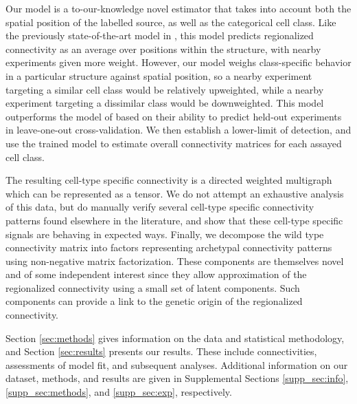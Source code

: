 Our model is a to-our-knowledge novel estimator that takes into account both the spatial position of the labelled source, as well as the categorical cell class.
Like the previously state-of-the-art model in \citet{Knox2019-ot}, this model predicts regionalized connectivity as an average over positions within the structure, with nearby experiments given more weight.
However, our model weighs class-specific behavior in a particular structure against spatial position, so a nearby experiment targeting a similar cell class would be relatively upweighted, while a nearby experiment targeting a dissimilar class would be downweighted.
This model outperforms the model of  \citet{Knox2019-ot} based on their ability to predict held-out experiments in leave-one-out cross-validation.
We then establish a lower-limit of detection, and use the trained model to estimate overall connectivity matrices for each assayed cell class.

The resulting cell-type specific connectivity is a directed weighted multigraph which can be represented as a  tensor.
We do not attempt an exhaustive analysis of this data, but do manually verify several cell-type specific connectivity patterns found elsewhere in the literature, and show that these cell-type specific signals are behaving in expected ways.
Finally, we decompose the wild type connectivity matrix into factors representing archetypal connectivity patterns using non-negative matrix factorization.
These components are themselves novel and of some independent interest since they allow approximation of the regionalized connectivity using a small set of latent components. Such components can provide a link to the genetic origin of the regionalized connectivity.

Section \ref{sec:methods} gives information on the data and statistical methodology, and Section \ref{sec:results} presents our results.
These include connectivities, assessments of model fit, and subsequent analyses.
Additional information on our dataset, methods, and results are given in Supplemental Sections \ref{supp_sec:info}, \ref{supp_sec:methods}, and \ref{supp_sec:exp}, respectively.
